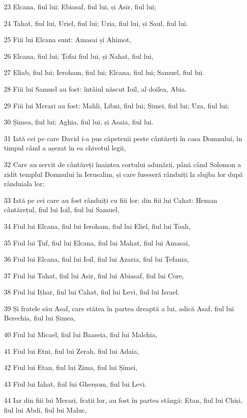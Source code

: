 \par 23 Elcana, fiul lui; Ebiasaf, fiul lui, și Asir, fiul lui;
\par 24 Tahat, fiul lui, Uriel, fiul lui; Uzia, fiul lui, și Saul, fiul lui.
\par 25 Fiii lui Elcana sunt: Amasai și Ahimot,
\par 26 Elcana, fiul lui; Țofai fiul lui, și Nahat, fiul lui,
\par 27 Eliab, fiul lui; Ieroham, fiul lui; Elcana, fiul lui; Samuel, fiul lui.
\par 28 Fiii lui Samuel au fost: întâiul născut Ioil, al doilea, Abia.
\par 29 Fiii lui Merari au fost: Mahli, Libni, fiul lui; Șimei, fiul lui; Uza, fiul lui;
\par 30 Șimea, fiul lui; Aghia, fiul lui, și Asaia, fiul lui.
\par 31 Iată cei pe care David i-a pus căpetenii peste cântăreți în casa Domnului, în timpul când a așezat în ea chivotul legii,
\par 32 Care au servit de cântăreți înaintea cortului adunării, până când Solomon a zidit templul Domnului în Ierusalim, și care fuseseră rânduiți la slujba lor după rânduiala lor;
\par 33 Iată pe cei care au fost rânduiți cu fiii lor: din fiii lui Cahat: Heman cântărețul, fiul lui Ioil, fiul lui Samuel,
\par 34 Fiul lui Elcana, fiul lui Ieroham, fiul lui Eliel, fiul lui Toah,
\par 35 Fiul lui Țuf, fiul lui Elcana, fiul lui Mahat, fiul lui Amasai,
\par 36 Fiul lui Elcana, fiul lui Ioil, fiul lui Azaria, fiul lui Țefania,
\par 37 Fiul lui Tahat, fiul lui Asir, fiul lui Abiasaf, fiul lui Core,
\par 38 Fiul lui Ițhar, fiul lui Cahat, fiul lui Levi, fiul lui Israel.
\par 39 Și fratele său Asaf, care stătea în partea dreaptă a lui, adică Asaf, fiul lui Berechia, fiul lui Șimea,
\par 40 Fiul lui Micael, fiul lui Baaseia, fiul lui Malchia,
\par 41 Fiul lui Etni, fiul lui Zerah, fiul lui Adaia,
\par 42 Fiul lui Etan, fiul lui Zima, fiul lui Șimei,
\par 43 Fiul lui Iahat, fiul lui Gherșom, fiul lui Levi.
\par 44 Iar din fiii lui Merari, frații lor, au fost în partea stângă: Etan, fiul lui Chiși, fiul lui Abdi, fiul lui Maluc,
